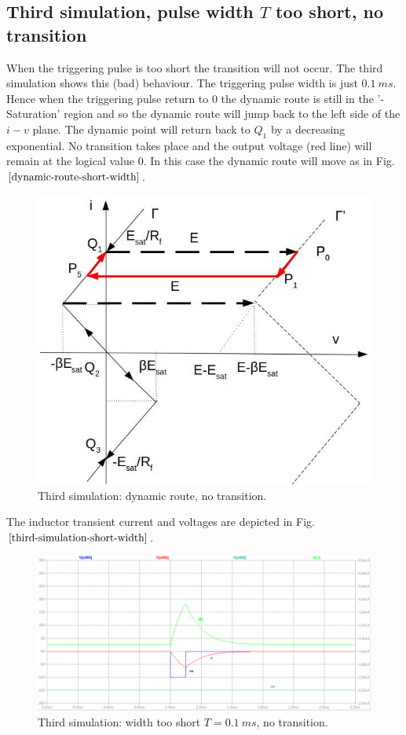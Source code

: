 \documentclass[12pt,a4paper,tweside,onehalfspacing]{article}
\begin{document}
\subsection{Third simulation, pulse width \texorpdfstring{$T$}{} too short, no transition}
When the triggering pulse is too short the transition will not occur. The third simulation shows this (bad) behaviour. The triggering pulse width is just $0.1\ ms$. Hence when the triggering pulse return to $0$ the dynamic route is still in the '- Saturation' region and so the dynamic route will jump back to the left side of the $i-v$ plane. The dynamic point will return back to $Q_1$ by a decreasing exponential. No transition takes place and the output voltage (red line) will remain at the logical value $0$.
In this case the dynamic route will move as in Fig. $\ref{dynamic-route-short-width}$.
\begin{figure}[!ht]
        \centering \includegraphics[width=0.6\columnwidth]{driving-point-characteristic-short-width-shifted.jpg}
        \caption{\label{dynamic-route-short-width} Third simulation: dynamic route, no transition.
        }
\end{figure}


\noindent The inductor transient current and voltages are depicted in Fig. $\ref{third-simulation-short-width}$.
%
\begin{figure}[!ht]
        \centering \includegraphics[width=0.8\columnwidth]{width-short-no-transition.png}
        \caption{\label{third-simulation-short-width}Third simulation: width too short $T=0.1\ ms$, no transition.
        }
\end{figure}
%
\clearpage
%
\newpage
%
\end{document}
